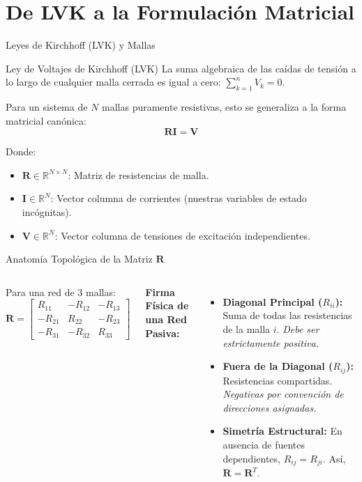 \documentclass[aspectratio=169]{beamer}
\begin{document}
\section{De LVK a la Formulación Matricial}
\begin{frame}{Leyes de Kirchhoff (LVK) y Mallas}
    \begin{block}{Ley de Voltajes de Kirchhoff (LVK)}
        La suma algebraica de las caídas de tensión a lo largo de cualquier malla cerrada es igual a cero: $\sum_{k=1}^{n} V_k = 0$.
    \end{block}
    
    \vspace{0.3cm}
    Para un sistema de $N$ mallas puramente resistivas, esto se generaliza a la forma matricial canónica:
    \begin{equation}
        \mathbf{R} \mathbf{I} = \mathbf{V}
    \end{equation}
    
    Donde:
    \begin{itemize}
        \item $\mathbf{R} \in \mathbb{R}^{N \times N}$: Matriz de resistencias de malla.
        \item $\mathbf{I} \in \mathbb{R}^{N}$: Vector columna de corrientes (nuestras variables de estado incógnitas).
        \item $\mathbf{V} \in \mathbb{R}^{N}$: Vector columna de tensiones de excitación independientes.
    \end{itemize}
\end{frame}

\begin{frame}{Anatomía Topológica de la Matriz $\mathbf{R}$}
    \begin{columns}
        Para una red de 3 mallas:
        \begin{equation*}
            \mathbf{R} = 
            \begin{bmatrix}
            R_{11} & -R_{12} & -R_{13} \\
            -R_{21} & R_{22} & -R_{23} \\
            -R_{31} & -R_{32} & R_{33}
            \end{bmatrix}
        \end{equation*}
        
        \textbf{Firma Física de una Red Pasiva:}
        \begin{itemize}
            \item \textbf{Diagonal Principal ($R_{ii}$):} Suma de todas las resistencias de la malla $i$. \textit{Debe ser estrictamente positiva.}
            \item \textbf{Fuera de la Diagonal ($R_{ij}$):} Resistencias compartidas. \textit{Negativas por convención de direcciones asignadas.}
            \item \textbf{Simetría Estructural:} En ausencia de fuentes dependientes, $R_{ij} = R_{ji}$. Así, $\mathbf{R} = \mathbf{R}^T$.
        \end{itemize}
    \end{columns}
\end{frame}
\end{document}
